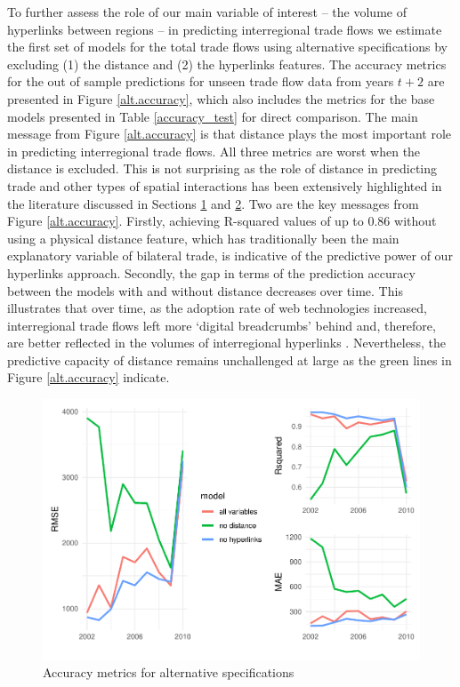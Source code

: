 \documentclass[]{interact}
\theoremstyle{plain}%
\theoremstyle{definition}
\theoremstyle{remark}
\begin{document}
To further assess the role of our main variable of interest -- the
volume of hyperlinks between regions -- in predicting interregional
trade flows we estimate the first set of models for the total trade
flows using alternative specifications by excluding (1) the distance and
(2) the hyperlinks features. The accuracy metrics for the out of sample
predictions for unseen trade flow data from years \(t + 2\) are
presented in Figure \ref{alt.accuracy}, which also includes the metrics
for the base models presented in Table \ref{accuracy_test} for direct
comparison. The main message from Figure \ref{alt.accuracy} is that
distance plays the most important role in predicting interregional trade
flows. All three metrics are worst when the distance is excluded. This
is not surprising as the role of distance in predicting trade and other
types of spatial interactions has been extensively highlighted in the
literature discussed in Sections \protect\hyperlink{sec:1}{1} and
\protect\hyperlink{sec:2}{2}. Two are the key messages from Figure
\ref{alt.accuracy}. Firstly, achieving R-squared values of up to
\(0.86\) without using a physical distance feature, which has
traditionally been the main explanatory variable of bilateral trade, is
indicative of the predictive power of our hyperlinks approach. Secondly,
the gap in terms of the prediction accuracy between the models with and
without distance decreases over time. This illustrates that over time,
as the adoption rate of web technologies increased, interregional trade
flows left more `digital breadcrumbs' behind and, therefore, are better
reflected in the volumes of interregional hyperlinks
\citep{rabari_storper2014}. Nevertheless, the predictive capacity of
distance remains unchallenged at large as the green lines in Figure
\ref{alt.accuracy} indicate.

\begin{figure}[p]
\includegraphics[width=1\linewidth]{hl_v2--and-_files/figure-latex/unnamed-chunk-10-1} \caption{\label{alt.accuracy}Accuracy metrics for alternative specifications}\label{fig:unnamed-chunk-10}
\end{figure}
\end{document}
